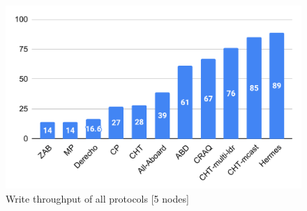 \begin{figure}[t]
  \centering
  \includegraphics[scale=0.4]{1_figures/Write-only-chart.pdf}
  \caption{Write throughput of all protocols [5 nodes]}
  \label{fig:write-all}
\end{figure}
